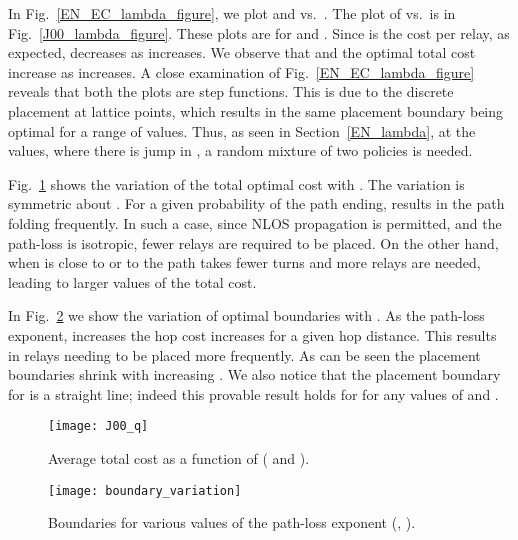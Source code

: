 \documentclass[conference]{IEEEtran}
\begin{document}
In Fig.~\ref{EN_EC_lambda_figure}, we plot  and
 vs.\ . The plot of  vs.\
 is in Fig.~\ref{J00_lambda_figure}.  These plots are for
 and . Since  is the cost per relay, as
expected,  decreases as  increases. We
observe that  and the optimal total cost
 increase as  increases. A close examination
of Fig.~\ref{EN_EC_lambda_figure} reveals that both the plots are step
functions.  This is due to the discrete placement at lattice points,
which results in the same placement boundary being optimal for a range
of  values. Thus, as seen in Section~\ref{EN_lambda}, at the
 values, where there is jump in , a
random mixture of two policies is needed.

Fig.~\ref{J00_q_figure} shows the variation of the total optimal cost
 with . The variation is symmetric about
. For a given probability  of the path ending, 
results in the path folding frequently. In such a case, since NLOS
propagation is permitted, and the path-loss is isotropic, fewer
relays are required to be placed. On the other hand, when  is close
to  or to  the path takes fewer turns and more relays are
needed, leading to larger values of the total cost.

In Fig.~\ref{boundary_variation_figure} we show the variation of optimal boundaries with 
. As  the path-loss exponent, increases the hop cost increases for a given hop 
distance. This results in relays needing to be placed more frequently. As can be seen the 
placement boundaries shrink with increasing . We also notice that the placement boundary 
for  is a straight line; indeed this provable result holds for  for any 
values of  and . 

\begin{figure}[t!]
\centering
\texttt{[image: J00\_q]}
\caption{Average total cost  as a function of  ( and ).}
\label{J00_q_figure}
\end{figure}

\begin{figure}[t]
\centering
\texttt{[image: boundary\_variation]}
\caption{Boundaries for various values of the path-loss exponent  (, ).}
\label{boundary_variation_figure}
\end{figure}
\end{document}
